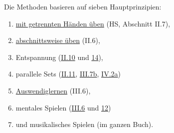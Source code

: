 Die Methoden basieren auf sieben Hauptprinzipien:

\begin{enumerate}[label={\arabic*.}] 
 \item \hyperlink{c1ii7}{mit getrennten Händen üben} (HS, Abschnitt II.7),
 \item \hyperlink{c1ii6}{abschnittsweise üben} (II.6),
 \item Entspannung (\hyperlink{c1ii10}{II.10} und \hyperlink{c1ii14}{14}),
 \item parallele Sets (\hyperlink{c1ii11}{II.11}, \hyperlink{c1iii7b}{III.7b}, \hyperlink{c1iv2a}{IV.2a})
 \item \hyperlink{c1iii6}{Auswendiglernen} (III.6),
 \item mentales Spielen (\hyperlink{c1iii6tastatur}{III.6} und \hyperlink{c1iii12}{12})
 \item und musikalisches Spielen (im ganzen Buch).
 \end{enumerate}
